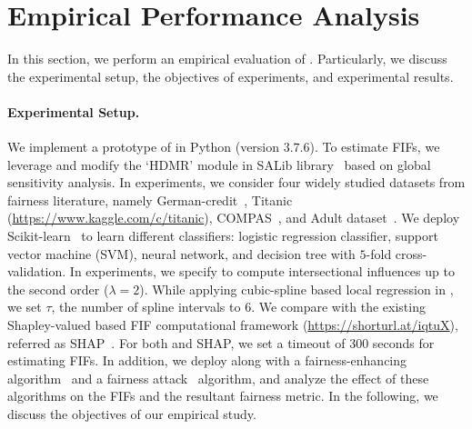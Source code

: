 \section{Empirical Performance Analysis}\label{fairness_fairXplainer_sec:experiments}
In this section, we perform an empirical evaluation of {\fairXplainer}. Particularly, we discuss the experimental setup, the objectives of experiments, and experimental results. 

\paragraph{Experimental Setup.} We implement a prototype of {\fairXplainer} in Python (version $ 3.7.6 $). To estimate FIFs, we leverage and modify the `HDMR' module in SALib library~\cite{Herman2017} based on global sensitivity analysis. In experiments, we consider four widely studied datasets from fairness literature, namely German-credit~\cite{Dua:2019},
Titanic (\url{https://www.kaggle.com/c/titanic}), COMPAS~\cite{angwin2016machine}, and Adult dataset~\cite{Dua:2019}. We deploy Scikit-learn~\cite{scikit-learn} to learn different classifiers: logistic regression classifier, support vector machine (SVM), neural network, and decision tree with $ 5 $-fold cross-validation. In experiments, we specify {\fairXplainer} to compute intersectional influences up to the second order ($ \lambda = 2 $). While applying cubic-spline based local regression in {\fairXplainer}, we set $ \tau $, the number of spline intervals to $ 6 $. We compare {\fairXplainer} with the existing Shapley-valued based FIF computational framework (\url{https://shorturl.at/iqtuX}), referred as SHAP~\cite{lundberg2020explaining}. For both {\fairXplainer} and SHAP, we set a timeout of $ 300 $ seconds for estimating FIFs. In addition, we deploy {\fairXplainer} along with a fairness-enhancing algorithm~\cite{kamiran2012data} and a fairness attack~\cite{solans2020poisoning} algorithm, and analyze the effect of these algorithms on the FIFs and the resultant fairness metric. In the following, we discuss the objectives of our empirical study. 


